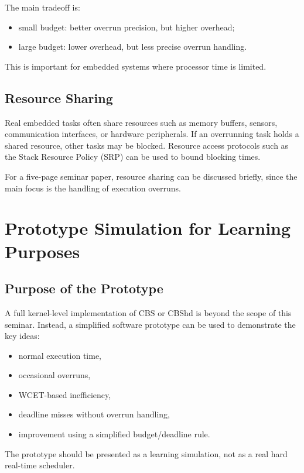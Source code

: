 \documentclass[conference]{IEEEtran}
\begin{document}
The main tradeoff is:

\begin{itemize}
    \item small budget: better overrun precision, but higher overhead;
    \item large budget: lower overhead, but less precise overrun handling.
\end{itemize}

This is important for embedded systems where processor time is limited.

\subsection{Resource Sharing}

Real embedded tasks often share resources such as memory buffers, sensors, communication interfaces, or hardware peripherals. If an overrunning task holds a shared resource, other tasks may be blocked. Resource access protocols such as the Stack Resource Policy (SRP) can be used to bound blocking times.

For a five-page seminar paper, resource sharing can be discussed briefly, since the main focus is the handling of execution overruns.

\section{Prototype Simulation for Learning Purposes}

\subsection{Purpose of the Prototype}

A full kernel-level implementation of CBS or CBShd is beyond the scope of this seminar. Instead, a simplified software prototype can be used to demonstrate the key ideas:

\begin{itemize}
    \item normal execution time,
    \item occasional overruns,
    \item WCET-based inefficiency,
    \item deadline misses without overrun handling,
    \item improvement using a simplified budget/deadline rule.
\end{itemize}

The prototype should be presented as a learning simulation, not as a real hard real-time scheduler.
\end{document}
